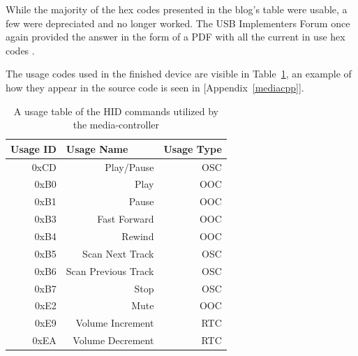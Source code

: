 \documentclass{article}
\begin{document}
			While the majority of the hex codes presented in the blog's table were usable, a few were depreciated and no longer worked. The USB Implementers Forum once again provided the answer in the form of a PDF with all the current in use hex codes \cite{HIDUsagePage:online}.
			
			The usage codes used in the finished device are visible in Table~\ref{usageTable}, an example of how they appear in the source code is seen in [Appendix~\ref{mediacpp}]. 
			
			\begin{table}[]
				\centering
				\caption{A usage table of the HID commands utilized by the media-controller}
				\label{usageTable}
				\begin{tabular}{|r|r|r|}
					\hline
					\multicolumn{1}{|l|}{Usage ID} & \multicolumn{1}{l|}{Usage Name} & \multicolumn{1}{l|}{Usage Type} \\ \hline
					0xCD                           & Play/Pause                      & OSC                             \\
					0xB0                           & Play                            & OOC                             \\
					0xB1                           & Pause                           & OOC                             \\
					0xB3                           & Fast Forward                    & OOC                             \\
					0xB4                           & Rewind                          & OOC                             \\
					0xB5                           & Scan Next Track                 & OSC                             \\
					0xB6                           & Scan Previous Track             & OSC                             \\
					0xB7                           & Stop                            & OSC                             \\
					0xE2                           & Mute                            & OOC                             \\
					0xE9                           & Volume Increment                & RTC                             \\
					0xEA                           & Volume Decrement                & RTC                             \\ \hline
				\end{tabular}
			\end{table}
			
\end{document}
